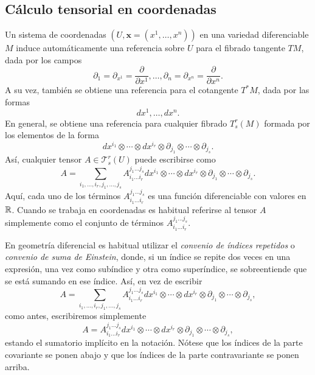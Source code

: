 \documentclass[11pt,a4paper]{amsbook}
\theoremstyle{remark} \newtheorem{rmk}[subsection]{Observación}
\theoremstyle{definition} \newtheorem{defn}[subsection]{Definición}
\theoremstyle{definition} \newtheorem{ex}[subsection]{Ejemplo}
\theoremstyle{definition} \newtheorem{ej}[subsection]{Ejercicio}
\begin{document}
\subsection{Cálculo tensorial en coordenadas} Un sistema de coordenadas $(U,\bm{x}=(x^1,\dots,x^n))$ en una variedad diferenciable $M$ induce automáticamente una referencia sobre $U$ para el fibrado tangente $TM$, dada por los campos
\begin{equation*}
\partial_1=\partial_{x^1} = \frac{\partial}{\partial x^1}, \dots, \partial_n=\partial_{x^n} = \frac{\partial}{\partial x^n}.
\end{equation*}
A su vez, también se obtiene una referencia para el cotangente $T^*M$, dada por las formas
\begin{equation*}
dx^1,\dots, dx^n.
\end{equation*}
En general, se obtiene una referencia para cualquier fibrado $T^r_s(M)$ formada por los elementos de la forma
\begin{equation*}
dx^{i_1} \otimes \cdots \otimes dx^{i_r} \otimes \partial_{j_1} \otimes \cdots \otimes \partial_{j_s}.
\end{equation*}
Así, cualquier tensor $A \in \mathcal{T}^r_s(U)$ puede escribirse como
\begin{equation*}
A = \sum_{i_1,\dots,i_r,j_1,\dots,j_s} A_{i_1 \dots i_r}^{j_1 \dots j_s}dx^{i_1} \otimes \cdots \otimes dx^{i_r} \otimes \partial_{j_1} \otimes \cdots \otimes \partial_{j_s}.
\end{equation*}
Aquí, cada uno de los términos $A_{i_1 \dots i_r}^{j_1 \dots j_s}$ es una función diferenciable con valores en $\mathbb R$. Cuando se trabaja en coordenadas es habitual referirse al tensor $A$ simplemente como el conjunto de términos $A_{i_1 \dots i_r}^{j_1 \dots j_s}$.

En geometría diferencial es habitual utilizar el \emph{convenio de índices repetidos} o \emph{convenio de suma de Einstein}, donde, si un índice se repite dos veces en una expresión, una vez como subíndice y otra como superíndice, se sobreentiende que se está sumando en ese índice. Así, en vez de escribir
\begin{equation*}
A = \sum_{i_1,\dots,i_r,j_1,\dots,j_s} A_{i_1 \dots i_r}^{j_1 \dots j_s}dx^{i_1} \otimes \cdots \otimes dx^{i_r} \otimes \partial_{j_1} \otimes \cdots \otimes \partial_{j_s},
\end{equation*}
como antes, escribiremos simplemente
\begin{equation*}
A = A_{i_1\dots i_r}^{j_1\dots j_s}dx^{i_1} \otimes \cdots \otimes dx^{i_r} \otimes \partial_{j_1} \otimes \cdots \otimes \partial_{j_s},
\end{equation*}
estando el sumatorio implícito en la notación. Nótese que los índices de la parte covariante se ponen abajo y que los índices de la parte contravariante se ponen arriba.
\end{document}
